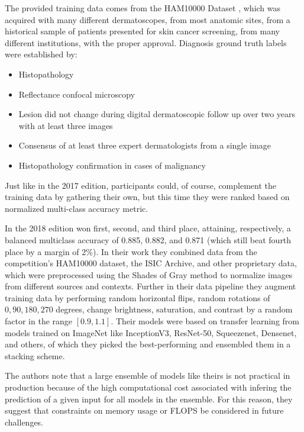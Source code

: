 The provided training data comes from the HAM10000 Dataset \cite{ham10000}, which was acquired with many different dermatoscopes, from most anatomic sites, from a historical sample of patients presented for skin cancer screening, from many different institutions, with the proper approval. Diagnosis ground truth labels were established by:

\begin{itemize}
    \item Histopathology
    \item Reflectance confocal microscopy
    \item Lesion did not change during digital dermatoscopic follow up over two years with at least three images
    \item Consensus of at least three expert dermatologists from a single image
    \item Histopathology confirmation in cases of malignancy
\end{itemize}

Just like in the 2017 edition, participants could, of course, complement the training data by gathering their own, but this time they were ranked based on normalized multi-class accuracy metric.

In the 2018 edition \citeauthor{isic2018first} \cite{isic2018first} won first, second, and third place, attaining, respectively, a balanced multiclass accuracy of 0.885, 0.882, and 0.871 (which still beat fourth place by a margin of 2\%). In their work they combined data from the competition's HAM10000 dataset, the ISIC Archive, and other proprietary data, which were preprocessed using the Shades of Gray method to normalize images from different sources and contexts. Further in their data pipeline they augment training data by performing random horizontal flips, random rotations of ${0, 90, 180, 270}$ degrees, change brightness, saturation, and contrast by a random factor in the range $[0.9, 1.1]$. Their models were based on transfer learning from models trained on ImageNet like InceptionV3, ResNet-50, Squeezenet, Densenet, and others, of which they picked the best-performing and ensembled them in a stacking scheme.

The authors note that a large ensemble of models like theirs is not practical in production because of the high computational cost associated with infering the prediction of a given input for all models in the ensemble. For this reason, they suggest that constraints on memory usage or \ac{FLOPS} be considered in future challenges.

